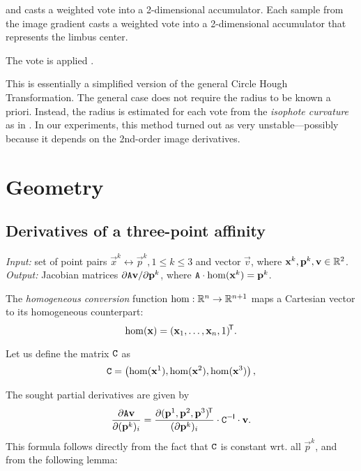 and casts a weighted vote into a 2-dimensional accumulator.
Each sample from the image gradient casts a weighted vote into a 2-dimensional accumulator that represents the limbus center.

The vote is applied \todo{\dots}.

This is essentially a simplified version of the general Circle Hough Transformation.
The general case does not require the radius to be known a priori.
Instead, the radius is estimated for each vote from the \textit{isophote curvature} as in \cite{valenti08,leo14}.
In our experiments, this method turned out as very unstable---possibly because it depends on the 2nd-order image derivatives.

\section{Geometry}

\subsection{Derivatives of a three-point affinity}
\label{s:algo-daff}
\textit{Input:} set of point pairs $\vec x^k \leftrightarrow \vec p^k, 1 \leq k \leq 3$ and vector $\vec v$, where $\mathbf{x}^k, \mathbf{p}^k, \mathbf{v} \in \mathbb{R}^2$.\\
\textit{Output:} Jacobian matrices $\partial \mathtt{A} \mathbf{v} / \partial \mathbf{p}^k$, where $\mathtt{A} \cdot \mathrm{hom}(\mathbf{x}^k) = \mathbf{p}^k$.\\

\begin{definition}
The \textit{homogeneous conversion} function $\mathrm{hom}: \mathbb{R}^n \to \mathbb{R}^{n + 1}$ maps a Cartesian vector to its homogeneous counterpart:
$$
\mathrm{hom}(\mathbf{x}) = (\mathbf{x}_1, \dots, \mathbf{x}_n, 1)^{\!\mathsf{T}}.
$$
\end{definition}

Let us define the matrix $\mathtt{C}$ as 
\begin{equation}
\mathtt{C} = \left( \mathrm{hom}(\mathbf{x}^1), \mathrm{hom}(\mathbf{x}^2), \mathrm{hom}(\mathbf{x}^3) \right),
\end{equation}

The sought partial derivatives are given by
\begin{equation} \label{e:algo-aff}
\frac {\partial \mathtt{A} \mathbf{v}} {\partial (\mathbf{p}^k)_i} = \frac {\partial (\mathbf{p}^1, \mathbf{p}^2, \mathbf{p}^3)^{\!\mathsf{T}}} {(\partial \mathbf{p}^k)_i} \cdot \mathtt{C} ^{-\mathsf{I}} \cdot \mathbf{v}.
\end{equation}
This formula follows directly from the fact that $\mathtt{C}$ is constant wrt. all $\vec p^k$, and from the following lemma:

